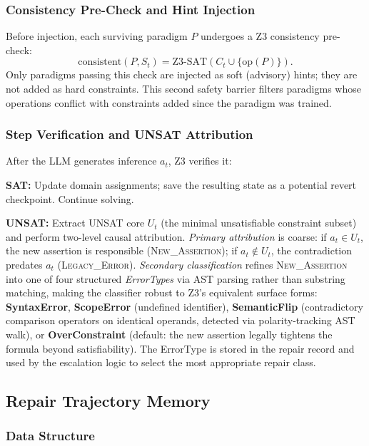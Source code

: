 \subsubsection{Consistency Pre-Check and Hint Injection}

Before injection, each surviving paradigm $P$ undergoes a Z3 consistency pre-check:
\[
\text{consistent}(P, S_t) = \text{Z3-SAT}(C_t \cup \{\text{op}(P)\}).
\]
Only paradigms passing this check are injected as soft (advisory) hints; they are not added as hard constraints. This second safety barrier filters paradigms whose operations conflict with constraints added since the paradigm was trained.

\subsubsection{Step Verification and UNSAT Attribution}

After the LLM generates inference $a_t$, Z3 verifies it:

\textbf{SAT:} Update domain assignments; save the resulting state as a potential revert checkpoint. Continue solving.

\textbf{UNSAT:} Extract UNSAT core $U_t$ (the minimal unsatisfiable constraint subset) and perform two-level causal attribution. \textit{Primary attribution} is coarse: if $a_t \in U_t$, the new assertion is responsible (\textsc{New\_Assertion}); if $a_t \notin U_t$, the contradiction predates $a_t$ (\textsc{Legacy\_Error}). \textit{Secondary classification} refines \textsc{New\_Assertion} into one of four structured \textit{ErrorTypes} via AST parsing rather than substring matching, making the classifier robust to Z3's equivalent surface forms: \textbf{SyntaxError}, \textbf{ScopeError} (undefined identifier), \textbf{SemanticFlip} (contradictory comparison operators on identical operands, detected via polarity-tracking AST walk), or \textbf{OverConstraint} (default: the new assertion legally tightens the formula beyond satisfiability). The ErrorType is stored in the repair record and used by the escalation logic to select the most appropriate repair class.

\subsection{Repair Trajectory Memory}
\label{ssec:memory}

\subsubsection{Data Structure}

